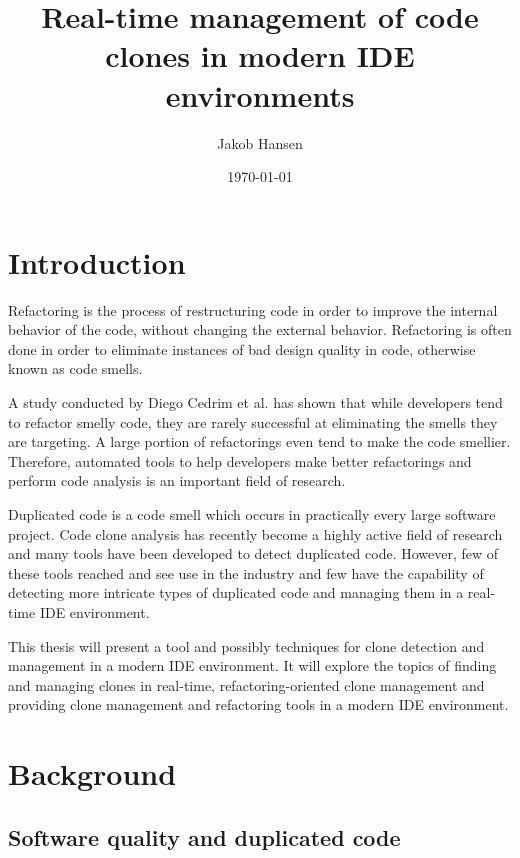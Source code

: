 \documentclass[12pt]{article}
\title{\vspace{-20px}Real-time management of code clones in modern IDE environments}
\author{Jakob Hansen}
\date{\today}
\begin{document}
\maketitle

\newpage

\tableofcontents

\newpage

\section{Introduction}

Refactoring is the process of restructuring code in order to improve the internal behavior
of the code, without changing the external behavior\cite[9]{fowlerrefactoring}.
Refactoring is often done in order to eliminate instances of bad design quality in code,
otherwise known as code smells.

A study conducted by Diego Cedrim et al. has shown that while developers tend to refactor
smelly code, they are rarely successful at eliminating the smells they are
targeting\cite{Rohit_Gheyi_Impact}. A large portion of refactorings even tend to make the
code smellier. Therefore, automated tools to help developers make better refactorings and
perform code analysis is an important field of research.

Duplicated code is a code smell which occurs in practically every large software project.
Code clone analysis has recently become a highly active field of research and many tools have
been developed to detect duplicated code\cite[7]{Inoue_introduction_to_cc}. However, few of
these tools reached and see use in the industry and few have the capability of detecting
more intricate types of duplicated code and managing them in a real-time IDE environment.

This thesis will present a tool and possibly techniques for clone detection and management
in a modern IDE environment. It will explore the topics of finding and managing clones in
real-time, refactoring-oriented clone management and providing clone management and
refactoring tools in a modern IDE environment.

\section{Background}

\subsection{Software quality and duplicated code}
\end{document}
